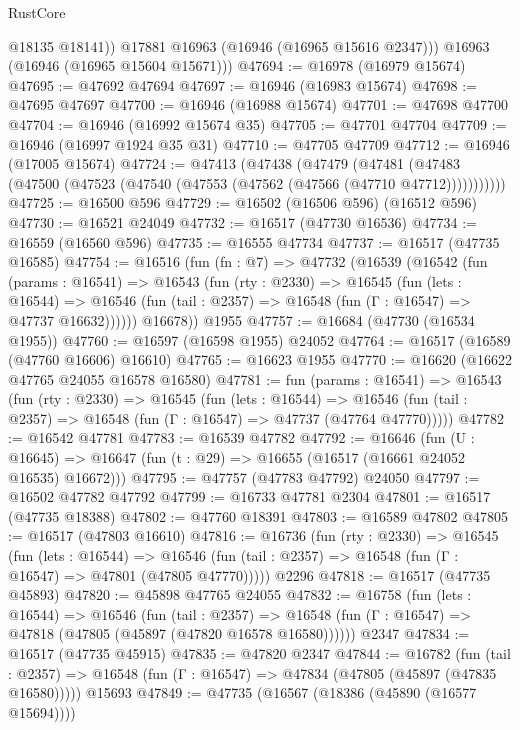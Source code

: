 \begin{lexlean}{RustCore}
\begin{coremodule}
            @18135
            @18141))
        @17881
        @16963
        (@16946 (@16965 @15616 @2347)))
      @16963
      (@16946 (@16965 @15604 @15671)))
@47694 := @16978 (@16979 @15674)
@47695 := @47692 @47694
@47697 := @16946 (@16983 @15674)
@47698 := @47695 @47697
@47700 := @16946 (@16988 @15674)
@47701 := @47698 @47700
@47704 := @16946 (@16992 @15674 @35)
@47705 := @47701 @47704
@47709 := @16946 (@16997 @1924 @35 @31)
@47710 := @47705 @47709
@47712 := @16946 (@17005 @15674)
@47724 := @47413
    (@47438
      (@47479
        (@47481 (@47483 (@47500 (@47523 (@47540 (@47553 (@47562 (@47566 (@47710 @47712)))))))))))
@47725 := @16500 @596
@47729 := @16502 (@16506 @596) (@16512 @596)
@47730 := @16521 @24049
@47732 := @16517 (@47730 @16536)
@47734 := @16559 (@16560 @596)
@47735 := @16555 @47734
@47737 := @16517 (@47735 @16585)
@47754 := @16516
    (fun (fn : @7) =>
    @47732
      (@16539
        (@16542
          (fun (params : @16541) =>
          @16543
            (fun (rty : @2330) =>
            @16545
              (fun (lets : @16544) =>
              @16546 (fun (tail : @2357) => @16548 (fun (Γ : @16547) => @47737 @16632))))))
        @16678))
    @1955
@47757 := @16684 (@47730 (@16534 @1955))
@47760 := @16597 (@16598 @1955) @24052
@47764 := @16517 (@16589 (@47760 @16606) @16610)
@47765 := @16623 @1955
@47770 := @16620 (@16622 @47765 @24055 @16578 @16580)
@47781 := fun (params : @16541) =>
  @16543
    (fun (rty : @2330) =>
    @16545
      (fun (lets : @16544) =>
      @16546 (fun (tail : @2357) => @16548 (fun (Γ : @16547) => @47737 (@47764 @47770)))))
@47782 := @16542 @47781
@47783 := @16539 @47782
@47792 := @16646
    (fun (U : @16645) => @16647 (fun (t : @29) => @16655 (@16517 (@16661 @24052 @16535) @16672)))
@47795 := @47757 (@47783 @47792) @24050
@47797 := @16502 @47782 @47792
@47799 := @16733 @47781 @2304
@47801 := @16517 (@47735 @18388)
@47802 := @47760 @18391
@47803 := @16589 @47802
@47805 := @16517 (@47803 @16610)
@47816 := @16736
    (fun (rty : @2330) =>
    @16545
      (fun (lets : @16544) =>
      @16546 (fun (tail : @2357) => @16548 (fun (Γ : @16547) => @47801 (@47805 @47770)))))
    @2296
@47818 := @16517 (@47735 @45893)
@47820 := @45898 @47765 @24055
@47832 := @16758
    (fun (lets : @16544) =>
    @16546
      (fun (tail : @2357) =>
      @16548 (fun (Γ : @16547) => @47818 (@47805 (@45897 (@47820 @16578 @16580))))))
    @2347
@47834 := @16517 (@47735 @45915)
@47835 := @47820 @2347
@47844 := @16782
    (fun (tail : @2357) => @16548 (fun (Γ : @16547) => @47834 (@47805 (@45897 (@47835 @16580)))))
    @15693
@47849 := @47735 (@16567 (@18386 (@45890 (@16577 @15694))))

\end{coremodule}
\end{lexlean}
